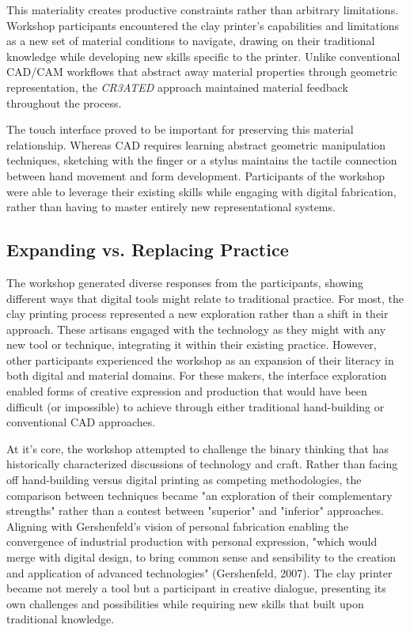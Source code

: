 \vspace{0.5cm}

This materiality creates productive constraints rather than arbitrary limitations. Workshop participants encountered the clay printer's capabilities and limitations as a new set of material conditions to navigate, drawing on their traditional knowledge while developing new skills specific to the printer. Unlike conventional CAD/CAM workflows that abstract away material properties through geometric representation, the \textit{CR3ATED} approach maintained material feedback throughout the process.

\vspace{0.5cm}

The touch interface proved to be important for preserving this material relationship. Whereas CAD requires learning abstract geometric manipulation techniques, sketching with the finger or a stylus maintains the tactile connection between hand movement and form development. Participants of the workshop were able to leverage their existing skills while engaging with digital fabrication, rather than having to master entirely new representational systems.

\subsection{Expanding vs. Replacing Practice}

The workshop generated diverse responses from the participants, showing different ways that digital tools might relate to traditional practice. For most, the clay printing process represented a new exploration rather than a shift in their approach. These artisans engaged with the technology as they might with any new tool or technique, integrating it within their existing practice. However, other participants experienced the workshop as an expansion of their literacy in both digital and material domains. For these makers, the interface exploration enabled forms of creative expression and production that would have been difficult (or impossible) to achieve through either traditional hand-building or conventional CAD approaches.

\vspace{0.5cm}

At it's core, the workshop attempted to challenge the binary thinking that has historically characterized discussions of technology and craft. Rather than facing off hand-building versus digital printing as competing methodologies, the comparison between techniques became "an exploration of their complementary strengths" rather than a contest between "superior" and "inferior" approaches. Aligning with Gershenfeld's vision of personal fabrication enabling the convergence of industrial production with personal expression, "which would merge with digital design, to bring common sense and sensibility to the creation and application of advanced technologies" (Gershenfeld, 2007). The clay printer became not merely a tool but a participant in creative dialogue, presenting its own challenges and possibilities while requiring new skills that built upon traditional knowledge.

